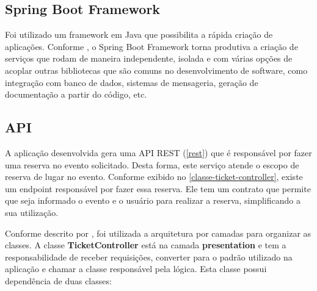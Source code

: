 \subsection{Spring Boot Framework}

Foi utilizado um framework em Java que possibilita a rápida criação de aplicações.
Conforme \cite[8]{spring-boot-reference-guide}, o Spring Boot Framework torna
produtiva a criação de serviços que rodam de maneira independente, isolada
e com várias opções de acoplar outras bibliotecas que são comuns no desenvolvimento
de software, como integração com banco de dados, sistemas de mensageria, geração
de documentação a partir do código, etc.


\subsection{API}

A aplicação desenvolvida gera uma API REST (\autoref{rest}) que é responsável por fazer uma reserva
no evento solicitado. Desta forma, este serviço atende o escopo de reserva de lugar no
evento. Conforme exibido no \autoref{classe-ticket-controller}, existe um endpoint responsável
por fazer essa reserva. Ele tem um contrato que permite que seja informado o evento e
o usuário para realizar a reserva, simplificando a sua utilização.

Conforme descrito por \cite{mark-richards-software-architecture-patterns},
foi utilizada a arquitetura por camadas para organizar as classes.
A classe \textbf{TicketController} está na camada \textbf{presentation} e tem a
responsabilidade de receber requisições, converter para o padrão utilizado na
aplicação e chamar a classe responsável pela lógica.
Esta classe possui dependência de duas classes:

